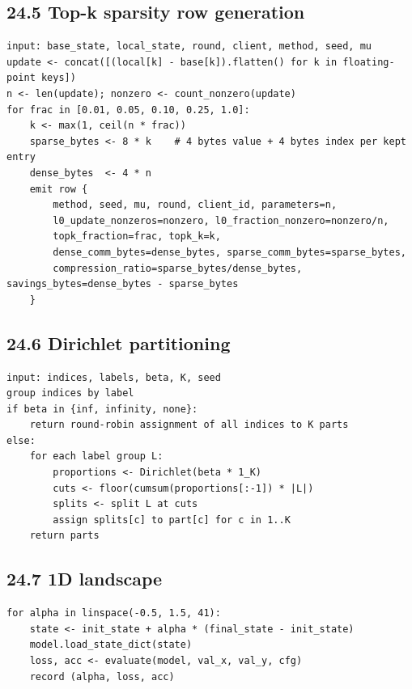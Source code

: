 \documentclass{article}
\begin{document}
\subsection{24.5 Top-k sparsity row generation}


\begin{lstlisting}[basicstyle=\scriptsize\ttfamily,breaklines=true]
input: base_state, local_state, round, client, method, seed, mu
update <- concat([(local[k] - base[k]).flatten() for k in floating-point keys])
n <- len(update); nonzero <- count_nonzero(update)
for frac in [0.01, 0.05, 0.10, 0.25, 1.0]:
    k <- max(1, ceil(n * frac))
    sparse_bytes <- 8 * k    # 4 bytes value + 4 bytes index per kept entry
    dense_bytes  <- 4 * n
    emit row {
        method, seed, mu, round, client_id, parameters=n,
        l0_update_nonzeros=nonzero, l0_fraction_nonzero=nonzero/n,
        topk_fraction=frac, topk_k=k,
        dense_comm_bytes=dense_bytes, sparse_comm_bytes=sparse_bytes,
        compression_ratio=sparse_bytes/dense_bytes, savings_bytes=dense_bytes - sparse_bytes
    }
\end{lstlisting}


\subsection{24.6 Dirichlet partitioning}


\begin{lstlisting}[basicstyle=\scriptsize\ttfamily,breaklines=true]
input: indices, labels, beta, K, seed
group indices by label
if beta in {inf, infinity, none}:
    return round-robin assignment of all indices to K parts
else:
    for each label group L:
        proportions <- Dirichlet(beta * 1_K)
        cuts <- floor(cumsum(proportions[:-1]) * |L|)
        splits <- split L at cuts
        assign splits[c] to part[c] for c in 1..K
    return parts
\end{lstlisting}


\subsection{24.7 1D landscape}


\begin{lstlisting}[basicstyle=\scriptsize\ttfamily,breaklines=true]
for alpha in linspace(-0.5, 1.5, 41):
    state <- init_state + alpha * (final_state - init_state)
    model.load_state_dict(state)
    loss, acc <- evaluate(model, val_x, val_y, cfg)
    record (alpha, loss, acc)
\end{lstlisting}
\end{document}
